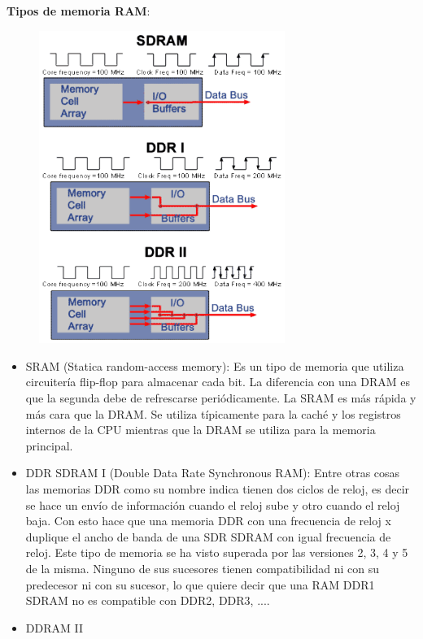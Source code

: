 \documentclass{article}
\begin{document}
\textbf{Tipos de memoria RAM}:
\begin{figure}[h]
\centering
\includegraphics[scale=1,width=80mm]{tiposram.png}
\end{figure}
\begin{itemize}
\item SRAM (Statica random-access memory): Es un tipo de memoria que utiliza circuitería flip-flop para almacenar cada bit. La diferencia con una DRAM es que la segunda debe de refrescarse periódicamente. La SRAM es más rápida y más cara que la DRAM. Se utiliza típicamente para la caché y los registros internos de la CPU mientras que la DRAM se utiliza para la memoria principal.

\item DDR SDRAM I (Double Data Rate Synchronous RAM): Entre otras cosas las memorias DDR como su nombre indica tienen dos ciclos de reloj, es decir se hace un envío de información cuando el reloj sube y otro cuando el reloj baja. Con esto hace que una memoria DDR con una frecuencia de reloj x duplique el ancho de banda de una SDR SDRAM con igual frecuencia de reloj. Este tipo de memoria se ha visto superada por las versiones 2, 3, 4 y 5 de la misma. Ninguno de sus sucesores tienen compatibilidad ni con su predecesor ni con su sucesor, lo que quiere decir que una RAM DDR1 SDRAM no es compatible con DDR2, DDR3, .... 
\item DDRAM II
\end{itemize}
\end{document}
